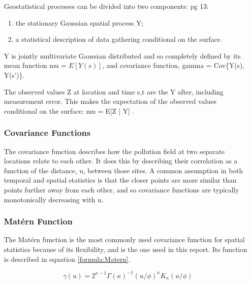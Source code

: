 Geostatistical processes can be divided into two components: 
\citep{diggle:07} pg 13: 
\begin{enumerate}
	\item the stationary Gaussian spatial process \gls{Y};
	\item a statistical description of data gathering conditional on the surface.
\end{enumerate}

\gls{Y} is jointly multivariate Gaussian distributed and so completely defined by its mean function \gls{mu} = $E[Y(s)]$, and covariance function, \gls{gamma} = 
Cov\{Y(s), Y(s')\}.

The observed values 
\gls{Z} at location and time \gls{s,t} are the \gls{Y} after, including measurement error.  This makes the expectation of the observed values conditional on the surface:
\gls{mu} = 
E[\gls{Z} | \gls{Y}] 
\citep{diggle:07}.

\subsubsection*{Covariance Functions}
\label{subsubsec:covariances}
The covariance function describes how the pollution field at two separate locations relate to each other. It does this by describing their correlation as a function of the distance, \gls{u}, between those sites.  A common assumption in both temporal and spatial statistics is that the closer points are more similar than points further away from each other, and so covariance functions are typically monotonically decreasing with \gls{u}.

\subsubsection*{Mat\'{e}rn Function} \label{subsubsec:MaternIntro}
The Mat\'{e}rn function is the most commonly used covariance function for spatial statistics because of its flexibility, \citep{diggle:07} and is the one used in this report.  Its function is described in equation \ref{formula:Matern}.

\begin{equation}  \label{formula:Matern}
	\gamma(u) = {2^{\kappa -1}\Gamma(\kappa)^{-1}(u/\phi)^{\kappa}K_{\kappa}(u/\phi)}
\end{equation}

